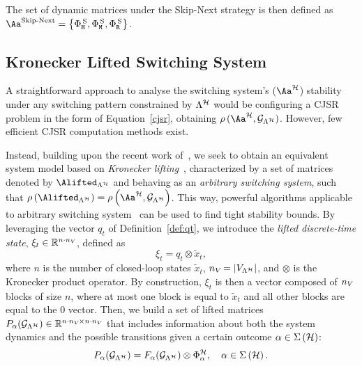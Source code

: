 %
The set of dynamic matrices under the Skip-Next strategy is then defined as $\Aa^{\text{Skip-Next}}=\left\{\clmat{}^{\,\text{S}}_{\cH},\clmat{}^{\,\text{S}}_{\cM},\clmat{}^{\,\text{S}}_{\cR}\right\}$.

\subsection{Kronecker Lifted Switching System}%
\label{sec:system_dynamics}
%
A straightforward approach to analyse the switching system's ($\Aa^\strat$) stability under any switching pattern constrained by $\Lambda^{\mathcal{H}}$ would be configuring a CJSR problem in the form of Equation~\eqref{cjsr}, obtaining $\rho\,(\Aa^\strat,\GG{\Lambda^\strat})$.
However, few efficient CJSR computation methods exist.

Instead, building upon the recent work of~\cite{xu2020approximation}, we seek to obtain an equivalent system model based on \emph{Kronecker lifting}~\cite{horn2012matrix}, characterized by a set of matrices denoted by $\Alifted_{\Lambda^\strat}$ and behaving as an \emph{arbitrary switching system}, such that $\rho\funof{\Alifted_{\Lambda^\strat}} = \rho\funof{\Aa^{\strat},\GG{\Lambda^\strat}}$.
This way, powerful algorithms applicable to arbitrary switching system~\cite{vankeerberghen2014jsr,sparsejsr} can be used to find tight stability bounds.
%
By leveraging the vector $q_t$ of Definition~\ref{def:qt}, we introduce the \emph{lifted discrete-time state}, $\xi_t\in\mathbb{R}^{n\cdot n_{V_{}}}$, defined as 
\begin{equation*}
    \xi_t = q_t\otimes \tilde x_t,
\end{equation*}
where $n$ is the number of closed-loop states $\tilde x_t$, $n_{V_{}} = \left|V_{\Lambda^{\mathcal{H}}}\right|$, and $\otimes$ is the Kronecker product operator.
By construction, $\xi_t$ is then a vector composed of $n_{V_{}}$ blocks of size $n$, where at most one block is equal to $\tilde x_t$ and all other blocks are equal to the $0$ vector.
%
Then, we build a set of lifted matrices $P_{\alpha} ( \mathcal{G}_{\Lambda^{\mathcal{H}}} )\in\mathbb{R}^{n\cdot n_{V_{}}\times n\cdot n_{V_{}}}$ that includes information about both the system dynamics and the possible transitions given a certain outcome $\alpha \in \Sigma\left(\mathcal{H}\right)$:
%
\begin{equation*}
    P_{\alpha} ( \mathcal{G}_{\Lambda^{\mathcal{H}}} ) = F_{\alpha} ( \mathcal{G}_{\Lambda^{\mathcal{H}}} )\otimes \Phi{}_\alpha^{\mathcal{H}},\quad \alpha \in \Sigma \left( \mathcal{H} \right).
\end{equation*}
